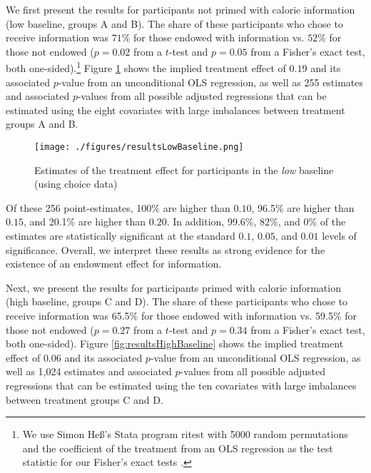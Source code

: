 We first present the results for participants not primed with calorie information (low baseline, groups A and B). The share of these participants who chose to receive information was $71\%$ for those endowed with information vs. $52\%$ for those not endowed ($p=0.02$ from a $t$-test and $p=0.05$ from a Fisher’s exact test,  both one-sided).\footnote{We use Simon Heß’s Stata program ritest \citep{hessRandomizationInferenceStata2017} with 5000 random permutations and the coefficient of the treatment from an OLS regression as the test statistic for our Fisher’s exact tests \citet{imbensCausalInferenceStatistics2015}.} Figure \ref{fig:resultsLowBaseline} shows the implied treatment effect of $0.19$ and its associated $p$-value from an unconditional OLS regression, as well as 255 estimates and associated $p$-values from all possible adjusted regressions that can be estimated using the eight covariates with large imbalances between treatment groups A and B.

\begin{figure}[ht]
  \caption{Estimates of the treatment effect for participants in the \emph{low} baseline \\ (using choice data)}\label{fig:resultsLowBaseline}
  \begin{center}
  {\texttt{[image: ./figures/resultsLowBaseline.png]}}
  \end{center}
\end{figure}

Of these 256 point-estimates, 100\% are higher than $0.10$, 96.5\% are higher than $0.15$, and 20.1\% are higher than $0.20$. In addition, 99.6\%, 82\%, and 0\% of the estimates are statistically significant at the standard $0.1$, $0.05$, and $0.01$ levels of significance. Overall, we interpret these results as strong evidence for the existence of an endowment effect for information.

Next, we present the results for participants primed with calorie information (high baseline, groups C and D). The share of these participants who chose to receive information was 65.5\% for those endowed with information vs. 59.5\% for those not endowed ($p=0.27$ from a $t$-test and $p=0.34$ from a Fisher’s exact test, both one-sided). Figure \ref{fig:resultsHighBaseline} shows the implied treatment effect of $0.06$ and its associated $p$-value from an unconditional OLS regression, as well as 1,024 estimates and associated $p$-values from all possible adjusted regressions that can be estimated using the ten covariates with large imbalances between treatment groups C and D.

